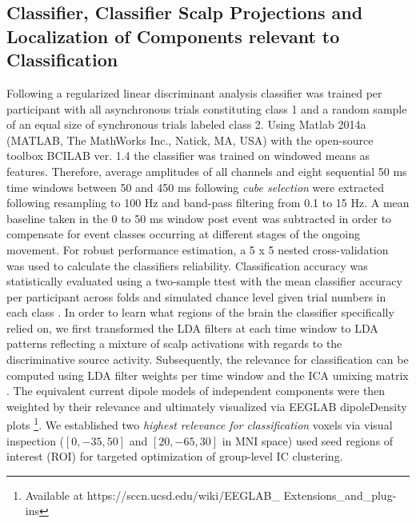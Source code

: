 \subsection{Classifier, Classifier Scalp Projections and Localization of Components relevant to Classification}
Following \citet{Zander2016} a regularized linear discriminant analysis classifier was trained per participant with all asynchronous trials constituting class 1 and a random sample of an equal size of synchronous trials labeled class 2. Using Matlab 2014a (MATLAB, The MathWorks Inc., Natick, MA, USA) with the open-source toolbox BCILAB ver. 1.4 the classifier was trained on windowed means as features. Therefore, average amplitudes of all channels and eight sequential 50 ms time windows between 50 and 450 ms following \textit{cube selection} were extracted following resampling to 100 Hz and band-pass filtering from 0.1 to 15 Hz. A mean baseline taken in the 0 to 50 ms window post event was subtracted in order to compensate for event classes occurring at different stages of the ongoing movement. For robust performance estimation, a 5 x 5 nested cross-validation was used to calculate the classifiers reliability. Classification accuracy was statistically evaluated using a two-sample ttest with the mean classifier accuracy per participant across folds and simulated chance level given trial numbers in each class \cite{Muller-Putz2007}. In order to learn what regions of the brain the classifier specifically relied on, we first transformed the LDA filters at each time window to LDA patterns reflecting a mixture of scalp activations with regards to the discriminative source activity. Subsequently, the relevance for classification can be computed using LDA filter weights per time window and the ICA umixing matrix \cites{Haufe2014a, Zander2016}. The equivalent current dipole models of independent components were then weighted by their relevance and ultimately visualized via EEGLAB dipoleDensity plots \cite{Krol2019}\footnote{Available at https://sccn.ucsd.edu/wiki/EEGLAB_ Extensions_and_plug-ins}. We established two \textit{highest relevance for classification} voxels via visual inspection ($[0, -35, 50]$ and $[20, -65, 30]$ in MNI space) used seed regions of interest (ROI) for targeted optimization of group-level IC clustering.


